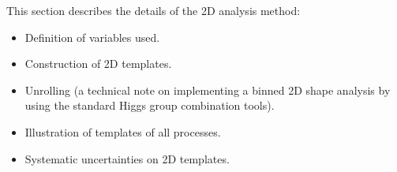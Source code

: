 This section describes the details of the 2D analysis method:

\begin{itemize}
    \item Definition of variables used.
    \item Construction of 2D templates.
    \item Unrolling (a technical note on implementing a binned 2D shape analysis
by using the standard Higgs group combination tools).
    \item Illustration of templates of all processes.
    \item Systematic uncertainties on 2D templates.
\end{itemize}

